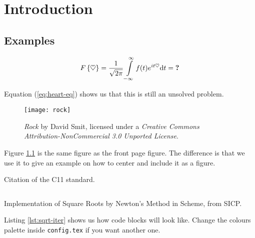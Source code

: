 
\chapter{Introduction}\label{ch:intro}

\section{Examples}

\lipsum[1-2]

\begin{equation} \label{eq:heart-eq}
  F\left\{ \heartsuit \right \} =
  \frac{1}{\sqrt{2\pi}} \int\limits_{-\infty}^{\infty} f(t) e^{i t \heartsuit} \mathrm{d} t
  = \text{\textbf{?}}
\end{equation}

Equation (\ref{eq:heart-eq}) shows us that this is still an unsolved problem.

\lipsum[3]

\begin{figure}
  \centering
  \texttt{[image: rock]}
  \caption[Rock]{\emph{Rock} by David Smit, licensed under a \emph{Creative
      Commons Attribution-NonCommercial 3.0 Unported License}.}
  \label{fig:rock}
\end{figure}

Figure \ref{fig:rock} is the same figure as the front page figure. The
difference is that we use it to give an example on how to center and include it
as a figure.

\lipsum[4]

Citation of the C11 standard\cite{iso2011c}.

\lipsum[11-12]

\begin{listing}
  \inputminted[frame=single,linenos,fontsize=\small,mathescape]{scm}{lst/sqrt-iter.scm}
  \caption[Square Roots in Scheme]{Implementation of Square Roots by Newton's
    Method in Scheme, from SICP.}
  \label{lst:sqrt-iter}
\end{listing}

Listing \ref{lst:sqrt-iter} shows us how code blocks will look like. Change the
colours palette inside \texttt{config.tex} if you want another one.

\lipsum[13]
